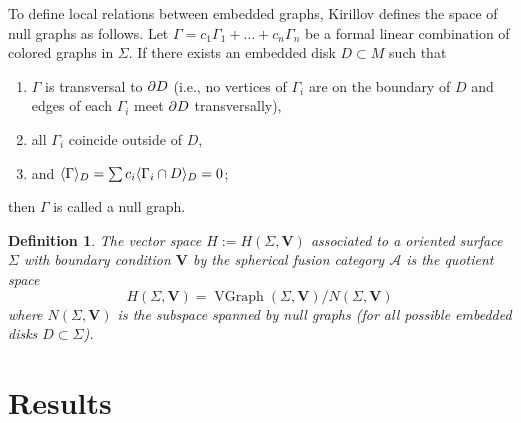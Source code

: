 \documentclass{ws-jktr}
\newtheorem{prop}[thm]{Proposition}
\newtheorem{defn}[thm]{Definition}
\newcommand{\Hs}{H}
\DeclareMathOperator{\MCG}{MCG}
\DeclareMathOperator{\Homeo}{Homeo}
\DeclareMathOperator{\VGr}{VGraph}
\newcommand{\VV}{\mathbf{V}}       %
\newcommand{\Ga}{\Gamma}
\newcommand{\Si}{\Sigma}
\begin{document}
To define local relations between embedded graphs, Kirillov defines the space of null graphs as follows. Let
$\Ga=c_1\Ga_1+\dots+c_n\Ga_n$ be a formal linear
combination of colored graphs in $\Si$.  If there exists an embedded disk $D \subset M$ such that
\begin{enumerate}
  \item $\Ga$ is transversal to $\partial D$ (i.e., no vertices of $\Ga_i$ 
      are on the boundary of $D$ and edges of each $\Ga_i$ meet 
      $\partial D$ transversally),
  \item all $\Ga_i$ coincide outside of $D$,
  \item and $\<\Ga\>_D=\sum c_i\<\Ga_i\cap D\>_D=0$;
\end{enumerate}
then $\Ga$ is called a null graph. 




\begin{defn}
The vector space $H := \Hs(\Si, \VV)$ associated to a oriented surface $\Si$ with boundary condition $\VV$ by the spherical fusion category $\mathcal A$ is the quotient space
 $$
   \Hs(\Si, \VV)=\VGr(\Si, \VV)/N(\Si, \VV)
  $$
  where $N(\Si, \VV)$ is  the subspace spanned by null graphs 
  (for all possible embedded disks  $D \subset \Si$). 
\end{defn}

\section{Results}



\end{document}
